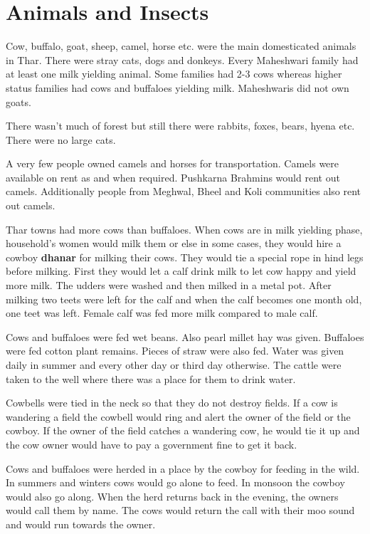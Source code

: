 \chapter{Animals and Insects}
Cow, buffalo, goat, sheep, camel, horse etc. were the main domesticated animals
in Thar. There were stray cats, dogs and donkeys. Every Maheshwari family had
at least one milk yielding animal. Some families had 2-3 cows whereas higher
status families had cows and buffaloes yielding milk. Maheshwaris did not own
goats.

There wasn't much of forest but still there were rabbits, foxes, bears, hyena
etc. There were no large cats.

A very few people owned camels and horses for transportation. Camels were
available on rent as and when required. Pushkarna Brahmins would rent out
camels. Additionally people from Meghwal, Bheel and Koli communities also rent
out camels.

Thar towns had more cows than buffaloes. When cows are in milk yielding phase,
household's women would milk them or else in some cases, they would hire a
cowboy \textbf{dhanar} for milking their cows. They would tie a special rope in
hind legs before milking. First they would let a calf drink milk to let cow
happy and yield more milk. The udders were washed and then milked in a metal
pot. After milking two teets were left for the calf and when the calf becomes
one month old, one teet was left. Female calf was fed more milk compared to
male calf.

Cows and buffaloes were fed wet beans. Also pearl millet hay was given.
Buffaloes were fed cotton plant remains. Pieces of straw were also fed. Water
was given daily in summer and every other day or third day otherwise. The
cattle were taken to the well where there was a place for them to drink water.

Cowbells were tied in the neck so that they do not destroy fields. If a cow is
wandering a field the cowbell would ring and alert the owner of the field or
the cowboy. If the owner of the field catches a wandering cow, he would tie it
up and the cow owner would have to pay a government fine to get it back.

Cows and buffaloes were herded in a place by the cowboy for feeding in the
wild. In summers and winters cows would go alone to feed. In monsoon the cowboy
would also go along. When the herd returns back in the evening, the owners
would call them by name. The cows would return the call with their moo sound
and would run towards the owner.

